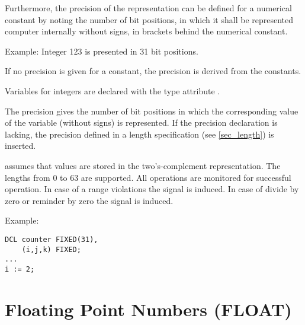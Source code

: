 Furthermore, the precision of the representation can be defined for a
numerical constant by noting the number of bit positions, in which it
shall be represented computer internally without signs, in brackets behind
the numerical constant.

Example:  \x Integer 123 is presented in 31 bit positions.

If no precision is given for a constant,
the precision is derived from the constants.

Variables for integers are declared with the type attribute .
\begin{grammarframe}


\end{grammarframe}

The precision gives the number of bit positions in which the
corresponding value of the variable (without signs) is represented. If
the precision declaration is lacking, the precision defined in a length
specification (see \ref{sec_length}) is inserted. 

\OpenPEARL{} assumes that  values are stored in 
the two's-complement representation.
The lengths from 0 to 63 are supported.
All operations are monitored for successful operation.
In case of a range violations the signal  is induced.
In case of divide by zero or reminder by zero the signal 
is induced.

Example:

\begin{lstlisting}
DCL counter FIXED(31),
    (i,j,k) FIXED;
...
i := 2;
\end{lstlisting}

\section{Floating Point Numbers (FLOAT)}  %
\label{sec_type_float}

